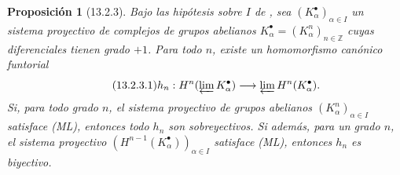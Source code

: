 \documentclass[10pt,oneside,openany]{book}
\theoremstyle{egaenv}\newtheorem*{env}{---}
\theoremstyle{egastatement}
\newtheorem*{proposition}{Proposición}
\theoremstyle{egadescription}
\begin{document}
\begin{proposition}[13.2.3]
\label{0.13.2.3}
\label{0.13.2.3-fr}
Bajo las hipótesis sobre $I$ de , sea
$(K_\alpha^\bullet)_{\alpha\in I}$ un sistema proyectivo
de complejos de grupos abelianos
$K_\alpha^\bullet=(K_\alpha^n)_{n\in\mathbb Z}$
cuyas diferenciales tienen grado $+1$.
Para todo $n$, existe un homomorfismo canónico funtorial
\begin{equation}
\label{0.13.2.3.1-fr}
\tag{13.2.3.1}
h_n:H^n(\varprojlim K_\alpha^\bullet)
\longrightarrow\varprojlim H^n(K_\alpha^\bullet).
\end{equation}
Si, para todo grado $n$, el sistema proyectivo de grupos abelianos
$(K_\alpha^n)_{\alpha\in I}$ satisface {\rm(ML)},
entonces todo $h_n$ son sobreyectivos. Si además, para un grado $n$, el sistema proyectivo $(H^{n-1}(K_\alpha^\bullet))_{\alpha\in I}$
satisface {\rm(ML)}, entonces $h_n$ es biyectivo.
\end{proposition}
\end{document}
